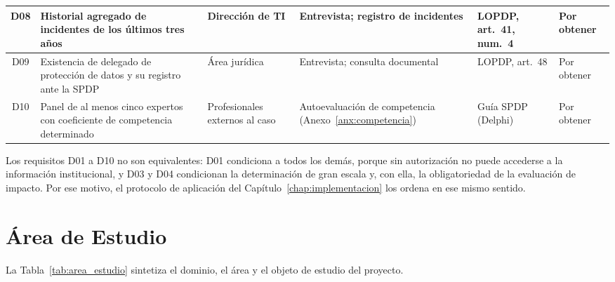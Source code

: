 \begin{table}[htbp]
\begin{tabularx}{\textwidth}{|c|L|>{\raggedright\arraybackslash}p{2.4cm}|>{\raggedright\arraybackslash}p{2.2cm}|>{\raggedright\arraybackslash}p{2.2cm}|>{\raggedright\arraybackslash}p{1.5cm}|}
    \hline
    D08 & Historial agregado de incidentes de los últimos tres años & Dirección de TI & Entrevista; registro de incidentes & LOPDP, art.~41, num.~4 & Por obtener \\
    \hline
    D09 & Existencia de delegado de protección de datos y su registro ante la SPDP & Área jurídica & Entrevista; consulta documental & LOPDP, art.~48 & Por obtener \\
    \hline
    D10 & Panel de al menos cinco expertos con coeficiente de competencia determinado & Profesionales externos al caso & Autoevaluación de competencia (Anexo~\ref{anx:competencia}) & Guía SPDP (Delphi) & Por obtener \\
    \hline
  \end{tabularx}
  \raggedright
\end{table}

Los requisitos D01 a D10 no son equivalentes: D01 condiciona a todos los demás, porque sin autorización no puede accederse a la información institucional, y D03 y D04 condicionan la determinación de gran escala y, con ella, la obligatoriedad de la evaluación de impacto. Por ese motivo, el protocolo de aplicación del Capítulo~\ref{chap:implementacion} los ordena en ese mismo sentido.

\section{Área de Estudio}

La Tabla~\ref{tab:area_estudio} sintetiza el dominio, el área y el objeto de estudio del proyecto.

